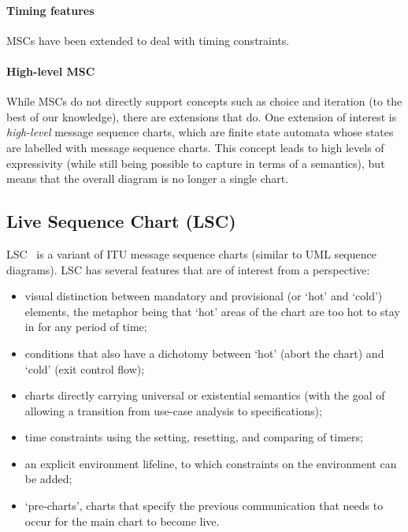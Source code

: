 \paragraph{Timing features}
MSCs have been extended to deal with timing constraints.

\paragraph{High-level MSC}

While MSCs do not directly support concepts such as choice and iteration
(to the best of our knowledge), there are extensions that do.  One extension
of interest is \emph{high-level} message sequence charts, which are finite state
automata whose states are labelled with message sequence charts.  This concept
leads to high levels of expressivity (while still being possible to capture in
terms of a semantics), but means that the overall diagram is no longer a single
chart.

\subsection{Live Sequence Chart (LSC)}

LSC~\cite{lsc} is a
variant of ITU message sequence charts (similar to UML sequence
diagrams).
LSC has several features that are of interest from a \langname{} perspective:

\begin{itemize}
\item visual distinction between mandatory and provisional (or `hot'
  and `cold') elements, the metaphor being that `hot' areas of the
  chart are too hot to stay in for any period of time;
\item conditions that also have a dichotomy between `hot' (abort the
  chart) and `cold' (exit control flow);
\item charts directly carrying universal or existential semantics (with the
  goal of allowing a transition from use-case analysis to specifications);
\item time constraints using the setting, resetting, and comparing of timers;
\item an explicit environment lifeline, to which constraints on the
  environment can be added;
\item `pre-charts', charts that specify the previous communication
  that needs to occur for the main chart to become live.
\end{itemize}

